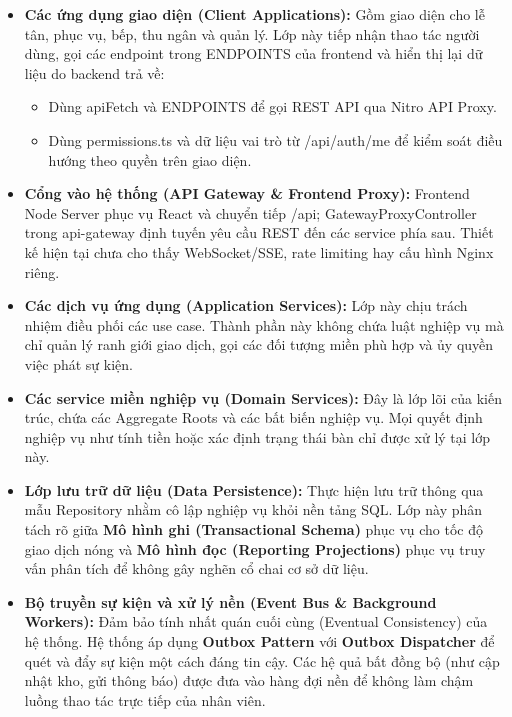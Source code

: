 \begin{itemize}
  \item \textbf{Các ứng dụng giao diện (Client Applications):} Gồm giao diện cho lễ tân, phục vụ, bếp, thu ngân và quản lý. Lớp này tiếp nhận thao tác người dùng, gọi các endpoint trong \textsf{ENDPOINTS} của frontend và hiển thị lại dữ liệu do backend trả về:
  \begin{itemize}
      \item Dùng \textsf{apiFetch} và \textsf{ENDPOINTS} để gọi REST API qua \textsf{Nitro API Proxy}.
      \item Dùng \textsf{permissions.ts} và dữ liệu vai trò từ \textsf{/api/auth/me} để kiểm soát điều hướng theo quyền trên giao diện.
  \end{itemize}

  \item \textbf{Cổng vào hệ thống (API Gateway \& Frontend Proxy):} \textsf{Frontend Node Server} phục vụ React và chuyển tiếp \textsf{/api}; \textsf{GatewayProxyController} trong \textsf{api-gateway} định tuyến yêu cầu REST đến các service phía sau. Thiết kế hiện tại chưa cho thấy WebSocket/SSE, rate limiting hay cấu hình Nginx riêng.

  \item \textbf{Các dịch vụ ứng dụng (Application Services):} Lớp này chịu trách nhiệm điều phối các use case. Thành phần này không chứa luật nghiệp vụ mà chỉ quản lý ranh giới giao dịch, gọi các đối tượng miền phù hợp và ủy quyền việc phát sự kiện.

  \item \textbf{Các service miền nghiệp vụ (Domain Services):} Đây là lớp lõi của kiến trúc, chứa các Aggregate Roots và các bất biến nghiệp vụ. Mọi quyết định nghiệp vụ như tính tiền hoặc xác định trạng thái bàn chỉ được xử lý tại lớp này.

  \item \textbf{Lớp lưu trữ dữ liệu (Data Persistence):} Thực hiện lưu trữ thông qua mẫu Repository nhằm cô lập nghiệp vụ khỏi nền tảng SQL. Lớp này phân tách rõ giữa \textbf{Mô hình ghi (Transactional Schema)} phục vụ cho tốc độ giao dịch nóng và \textbf{Mô hình đọc (Reporting Projections)} phục vụ truy vấn phân tích để không gây nghẽn cổ chai cơ sở dữ liệu.

  \item \textbf{Bộ truyền sự kiện và xử lý nền (Event Bus \& Background Workers):} Đảm bảo tính nhất quán cuối cùng (Eventual Consistency) của hệ thống. Hệ thống áp dụng \textbf{Outbox Pattern} với \textbf{Outbox Dispatcher} để quét và đẩy sự kiện một cách đáng tin cậy. Các hệ quả bất đồng bộ (như cập nhật kho, gửi thông báo) được đưa vào hàng đợi nền để không làm chậm luồng thao tác trực tiếp của nhân viên.


\end{itemize}

